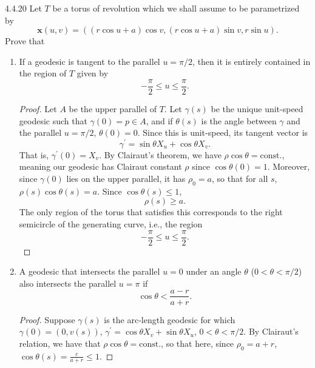 \documentclass[11pt]{article}
\begin{document}
\begin{problem}{4.4.20}
  Let \( T \) be a torus of revolution which we shall assume to be parametrized by
  \begin{equation}
  \label{eq:1}
  \mathbf{x}(u,v) = ((r\cos u + a)\cos v, (r\cos u + a)\sin v, r \sin u).
\end{equation}
Prove that
\begin{enumerate}[label=\alph*.]
  \item If a geodesic is tangent to the parallel \( u = \pi / 2 \), then it is entirely contained in the region of \( T \) given by
        \begin{equation}
        \label{eq:3}
        - \frac{\pi}{2} \leq u \leq \frac{\pi}{2}.
      \end{equation}
        \begin{proof}
          Let \( A \) be the upper parallel of \( T \). Let \(\gamma(s)\) be the unique unit-speed geodesic such that \(\gamma(0) = p \in A\), and if \( \theta(s) \) is the angle between \(\gamma\) and the parallel \( u = \pi/2 \), \(\theta(0) = 0\).
          Since this is unit-speed, its tangent vector is
          \begin{equation}
          \label{eq:18}
          \gamma^{\prime} = \sin\theta X_u + \cos\theta X_{v}.
        \end{equation}
        That is, \(\gamma^{\prime}(0) = X_v\).
        By Clairaut's theorem, we have \( \rho\cos\theta = \text{const.} \), meaning our geodesic has Clairaut constant \( \rho \) since \( \cos\theta(0) = 1 \).
        Moreover, since \(\gamma(0)\) lies on the upper parallel, it has \(\rho_{0} = a\), so that for all \( s \), \( \rho(s)\cos\theta(s) = a \).
        Since \( \cos\theta(s) \leq 1 \),
        \begin{equation}
        \label{eq:20}
        \rho(s) \geq a.
      \end{equation}
      The only region of the torus that satisfies this corresponds to the right semicircle of the generating curve, i.e., the region
      \begin{equation}
      \label{eq:21}
      - \frac{\pi}{2} \leq u \leq \frac{\pi}{2}.
      \end{equation}
        \end{proof}
  \item A geodesic that intersects the parallel \( u = 0 \) under an angle \(\theta\) (\( 0 < \theta < \pi/2 \)) also intersects the parallel \( u = \pi\) if
        \begin{equation}
        \label{eq:4}
        \cos\theta < \frac{a-r}{a+r}.
        \end{equation}
        \begin{proof}
          Suppose \(\gamma(s)\) is the arc-length geodesic for which \(\gamma(0) = (0, v(s)) \), \(\gamma^{\prime} = \cos\theta X_v + \sin\theta X_u\), \( 0 < \theta < \pi/2 \).
          By Clairaut's relation, we have that \( \rho\cos\theta = \text{const.} \), so that here, since \(\rho_0 = a + r\), \( \cos\theta(s) = \frac{c}{a+r} \leq 1\).


\end{proof}
\end{enumerate}
\end{problem}
\end{document}
